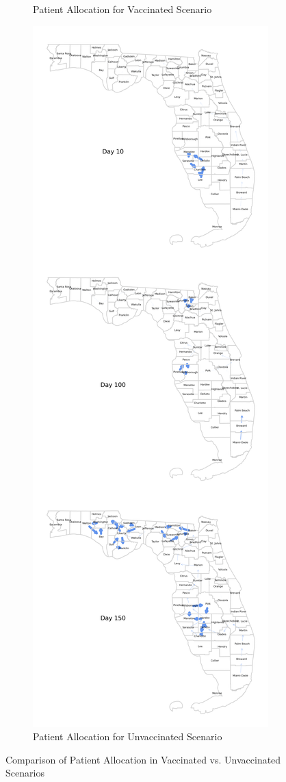 \documentclass{article}
\begin{document}
\begin{figure}
\begin{subfigure}{0.43\linewidth}
        \caption{Patient Allocation for Vaccinated Scenario}\label{fig:patientAllocVax}
    \end{subfigure}
    \hspace{2em}
    \begin{subfigure}{0.43\linewidth}
        \centering
        \includegraphics[width=\linewidth]{pics/paperStackedPatientTransfersNoVax.png}
        \caption{Patient Allocation for Unvaccinated Scenario}\label{fig:patientAllocNoVax}
    \end{subfigure}
    \caption{Comparison of Patient Allocation in Vaccinated vs. Unvaccinated Scenarios}\label{fig:patientAlloc}
\end{figure}
\end{document}
